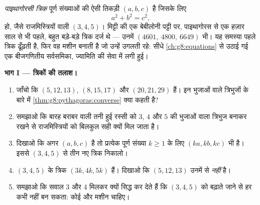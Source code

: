 \begin{problem}[{सप्ताहांत समस्या --- पूर्ण संख्याओं वाले समकोण
त्रिभुज, और वह सर्वसमिका
$(m^2 - n^2)^2 + (2mn)^2 = (m^2 + n^2)^2$ जो उन सबको बना देती है}]
\label{pb:g8:pythagoras:1}
\emph{पाइथागोरसी त्रिक} पूर्ण संख्याओं की
ऐसी तिकड़ी $(a, b, c)$ है जिसके लिए
\[
a^2 + b^2 = c^2 ,
\]
हो, जैसे राजमिस्त्रियों वाली $(3, 4, 5)$। मिट्टी की एक बेबीलोनी
पट्टी पर, पाइथागोरस से एक हज़ार साल से भी पहले, बहुत बड़े-बड़े त्रिक
दर्ज थे --- उनमें $(4601,\ 4800,\ 6649)$ भी। यह समस्या पहले त्रिक
ढूँढ़ती है, फिर वह मशीन बनाती है जो उन्हें उगलती रहे: सीधे
\cref{ch:g8:equations} से उठाई गई एक बीजगणितीय सर्वसमिका, ज्यामिति
की सेवा में लगी हुई।

\medskip
\noindent\textbf{भाग I --- त्रिकों की तलाश।}
\begin{enumerate}
  \item जाँचो कि $(5, 12, 13)$, $(8, 15, 17)$ और $(20, 21, 29)$
         हैं। इन भुजाओं वाले त्रिभुजों के बारे में
        \cref{thm:g8:pythagoras:converse} क्या कहती है?
  \item समझाओ कि बारह बराबर  वाली तनी हुई रस्सी को $3$,
        $4$ और $5$  की भुजाओं वाला त्रिभुज बनाकर रखने से
        राजमिस्त्रियों को बिलकुल सही  क्यों मिल जाता है।
  \item दिखाओ कि अगर $(a, b, c)$  है तो प्रत्येक
        पूर्ण संख्या $k \geq 1$ के लिए $(ka, kb, kc)$ भी है। इससे
        $(3, 4, 5)$ से तीन नए त्रिक निकालो।
  \item $(3, 4, 5)$ के  त्रिक $(3k, 4k, 5k)$ हैं। दिखाओ कि
        $(5, 12, 13)$ उनमें से \emph{नहीं} है।
  \item समझाओ कि सवाल 3 और 4 मिलकर क्यों सिद्ध कर देते हैं कि
        $(3, 4, 5)$ को बढ़ाते जाने से हर  कभी नहीं
        बन सकता: कोई और मशीन चाहिए।
\end{enumerate}


\end{problem}
